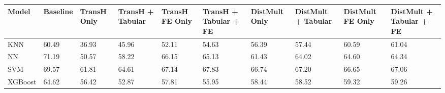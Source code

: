 \begin{tabular}{llllllllll}
\toprule
Model & Baseline & TransH Only & TransH + Tabular & TransH FE Only & TransH + Tabular + FE & DistMult Only & DistMult + Tabular & DistMult FE Only & DistMult + Tabular + FE \\
\midrule
KNN & 60.49 & 36.93 & 45.96 & 52.11 & 54.63 & 56.39 & 57.44 & 60.59 & 61.04 \\
NN & 71.19 & 50.57 & 58.22 & 66.15 & 65.13 & 61.43 & 64.02 & 64.60 & 64.34 \\
SVM & 69.57 & 61.81 & 64.61 & 67.14 & 67.83 & 66.74 & 67.20 & 66.65 & 67.06 \\
XGBoost & 64.62 & 56.42 & 52.87 & 57.81 & 55.95 & 58.44 & 58.52 & 59.32 & 59.26 \\
\bottomrule
\end{tabular}
